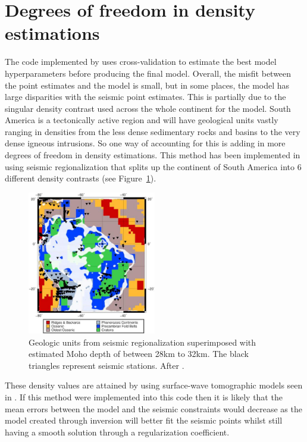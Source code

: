\section{Degrees of freedom in density estimations}
The code implemented by \cite{Uieda2016} uses cross-validation to estimate the best model hyperparameters before producing the final model. Overall, the misfit between the point estimates and the model is small, but in some places, the model has large disparities with the seismic point estimates. This is partially due to the singular density contrast used across the whole continent for the model. South America is a tectonically active region and will have geological units vastly ranging in densities from the less dense sedimentary rocks and basins to the very dense igneous intrusions. So one way of accounting for this is adding in more degrees of freedom in density estimations. This method has been implemented in \cite{Haas2020} using seismic regionalization that splits up the continent of South America into 6 different density contrasts (see Figure~\ref{fig:haas}).
\begin{figure}[h]
  \begin{center}
    \includegraphics[width=0.5\textwidth]{figures/Haas-blocking}
  \end{center}
  \caption{
   Geologic units from seismic regionalization superimposed with estimated Moho depth of between 28km to 32km. The black triangles represent seismic stations. After \cite{Haas2020}.
  }
  \label{fig:haas}
\end{figure}
These density values are attained by using surface-wave tomographic models seen in \cite{Schaeffer2015global}. If this method were implemented into this code then it is likely that the mean errors between the model and the seismic constraints would decrease as the model created through inversion will better fit the seismic points whilst still having a smooth solution through a regularization coefficient. 
